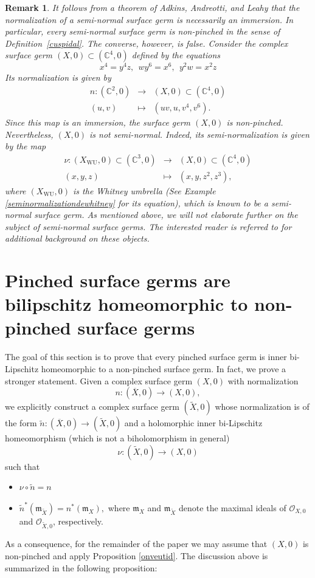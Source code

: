 \documentclass[reqno,dvipsnames,12pt]{amsart}
\newtheorem{rema}[thm]{Remark}
\begin{document}
\begin{rema}
It follows from a theorem of Adkins, Andreotti, and Leahy \cite{adkin1977} that the normalization of a semi-normal surface germ is necessarily an immersion. In particular, every semi-normal surface germ is non-pinched in the sense of Definition~\ref{cuspidal}. The converse, however, is false. Consider the complex surface germ $(X,0) \subset (\mathbb{C}^4,0)$ defined by the equations
\[
x^4 = y^4 z, \ \ wy^6=x^6, \ \ y^2w=x^2z
\]
Its normalization is given by
\[
\begin{array}{ccc}
n : (\mathbb{C}^2,0) & \longrightarrow & (X,0) \subset (\mathbb{C}^4,0) \\
(u,v) & \longmapsto & (uv,u,v^4,v^6).
\end{array}
\]
Since this map is an immersion, the surface germ $(X,0)$ is non-pinched. Nevertheless, $(X,0)$ is not semi-normal. Indeed, its semi-normalization is given by the map
\[
\begin{array}{ccc}
\nu : (X_{\mathrm{WU}},0) \subset (\mathbb{C}^3,0) & \longrightarrow & (X,0) \subset (\mathbb{C}^4,0) \\
(x,y,z) & \longmapsto & (x,y,z^2,z^3),
\end{array}
\]
where $(X_{\mathrm{WU}},0)$ is the Whitney umbrella (See Example \ref{seminormalizationdewhitney} for its equation), which is known to be a semi-normal surface germ. As mentioned above, we will not elaborate further on the subject of semi-normal surface germs. The interested reader is referred to \cite[Ch.~I, \S15]{seminormalgrauert} for additional background on these objects.
\end{rema}

\section{Pinched surface germs are bilipschitz homeomorphic to  non-pinched surface germs}\label{cuspidaletnoncuspidal}
The goal of this section is to prove that every pinched surface germ is inner bi-Lipschitz homeomorphic to a non-pinched surface germ. In fact, we prove a stronger statement. Given a complex surface germ $(X,0)$ with normalization 
\[
n : (\overline{X},0) \longrightarrow (X,0),
\]
we explicitly construct a complex surface germ $(\widetilde{X},0)$ whose normalization is of the form  $\widetilde{n}:(\overline{X},0) \longrightarrow (\widetilde{X},0)$ and a  holomorphic inner bi-Lipschitz homeomorphism (which is not a biholomorphism in general)
\[
\nu : (\widetilde{X},0) \longrightarrow (X,0)\]such that \begin{itemize}
    \item  $\nu \circ \widetilde{n} = n$ 
\item $\widetilde{n}^*(\mathfrak{m}_{\widetilde{X}}) = n^*(\mathfrak{m}_X),$ where $\mathfrak{m}_{X}$ and $\mathfrak{m}_{\widetilde{X}}$ denote the maximal ideals of $\mathcal{O}_{X,0}$ and $\mathcal{O}_{\widetilde{X},0}$, respectively.
\end{itemize}
As a consequence, for the remainder of the paper we may assume that $(X,0)$ is non-pinched and apply Proposition \ref{onveutid}. The discussion above is summarized in the following  proposition:
\end{document}
